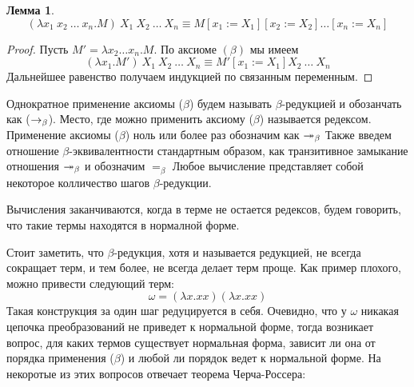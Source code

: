 \documentclass[lambda.tex]{subfiles}
\begin{document}
\newtheorem{lemma}{Лемма}
\begin{lemma}
\[(\lambda x_1 \ x_2 \ \dots\ x_n .M)\ X_1 \ X_2 \ \dots\ X_n \equiv M[x_1 := X_1 ][x_2 := X_2]\dots[x_n := X_n ]\]
\end{lemma}
\begin{proof}
Пусть $M' = \lambda x_2 \dots x_n .M$. По аксиоме $(\beta)$ мы имеем
\[(\lambda x_1 .M')\ X_1 \ X_2 \ \dots\ X_n \equiv M'[x_1 := X_1 ] X_2 \ \dots\ X_n\]
Дальнейшее равенство получаем индукцией по связанным переменным.
\end{proof}

\begin{tcolorbox}
Однократное применение аксиомы ($\beta$) будем называть $\beta$-редукцией и обозанчать как ($\rightarrow_\beta$). Место, где можно применить аксиому ($\beta$) называется редексом. 
Применение аксиомы ($\beta$) ноль или более раз обозначим как $\twoheadrightarrow_\beta$
Также введем отношение $\beta$-эквивалентности стандартным образом, как транзитивное замыкание отношения $\twoheadrightarrow_\beta$ и обозначим $=_\beta$
Любое вычисление представляет собой некоторое колличество шагов $\beta$-редукции.

Вычисления заканчиваются, когда в терме не остается редексов, будем говорить, что такие термы находятся в нормалной форме.

Стоит заметить, что $\beta$-редукция, хотя и называется редукцией, не всегда сокращает терм, и тем более, не всегда делает терм проще. Как пример плохого, можно привести следующий терм:
\begin{equation*}
	\omega = (\lambda x.xx)(\lambda x.xx)
\end{equation*}
Такая конструкция за один шаг редуцируется в себя. Очевидно, что у $\omega$ никакая цепочка преобразований не приведет к нормальной форме, тогда возникает вопрос, для каких термов существует нормальная форма, зависит ли она от порядка применения ($\beta$) и любой ли порядок ведет к нормальной форме. На некоротые из этих вопросов отвечает теорема Черча-Россера:


\end{tcolorbox}
\end{document}

